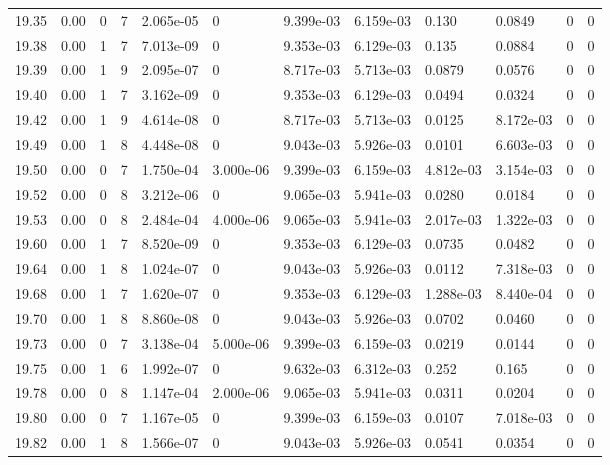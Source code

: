 \documentclass[preview]{standalone}
\begin{document}
{{{{{{{\begin{tabular}{L{1.2cm}C{1.2cm} C{0.3cm}C{0.5cm} C{1.4cm}C{1.4cm} C{1.4cm}C{1.4cm} C{1.6cm}C{1.6cm} C{1.6cm}C{1.6cm}}
  19.35  &  0.00  & 0     &  7 &  2.065e-05  & 0  &  9.399e-03&   6.159e-03& 0.130 & 0.0849   &  0 & 0  \\ 
  19.38  &  0.00  & 1     &  7 &  7.013e-09  & 0  &  9.353e-03&   6.129e-03& 0.135 & 0.0884   &  0 & 0  \\ 
  19.39  &  0.00  & 1     &  9 &  2.095e-07  & 0  &  8.717e-03&   5.713e-03& 0.0879 & 0.0576   &  0 & 0  \\ 
  19.40  &  0.00  & 1     &  7 &  3.162e-09  & 0  &  9.353e-03&   6.129e-03& 0.0494 & 0.0324   &  0 & 0  \\ 
  19.42  &  0.00  & 1     &  9 &  4.614e-08  & 0  &  8.717e-03&   5.713e-03& 0.0125 & 8.172e-03   &  0 & 0  \\ 
  19.49  &  0.00  & 1     &  8 &  4.448e-08  & 0  &  9.043e-03&   5.926e-03& 0.0101 & 6.603e-03   &  0 & 0  \\ 
  19.50  &  0.00  & 0     &  7 &  1.750e-04  & 3.000e-06  &  9.399e-03&   6.159e-03& 4.812e-03 & 3.154e-03   &  0 & 0  \\ 
  19.52  &  0.00  & 0     &  8 &  3.212e-06  & 0  &  9.065e-03&   5.941e-03& 0.0280 & 0.0184   &  0 & 0  \\ 
  19.53  &  0.00  & 0     &  8 &  2.484e-04  & 4.000e-06  &  9.065e-03&   5.941e-03& 2.017e-03 & 1.322e-03   &  0 & 0  \\ 
  19.60  &  0.00  & 1     &  7 &  8.520e-09  & 0  &  9.353e-03&   6.129e-03& 0.0735 & 0.0482   &  0 & 0  \\ 
  19.64  &  0.00  & 1     &  8 &  1.024e-07  & 0  &  9.043e-03&   5.926e-03& 0.0112 & 7.318e-03   &  0 & 0  \\ 
  19.68  &  0.00  & 1     &  7 &  1.620e-07  & 0  &  9.353e-03&   6.129e-03& 1.288e-03 & 8.440e-04   &  0 & 0  \\ 
  19.70  &  0.00  & 1     &  8 &  8.860e-08  & 0  &  9.043e-03&   5.926e-03& 0.0702 & 0.0460   &  0 & 0  \\ 
  19.73  &  0.00  & 0     &  7 &  3.138e-04  & 5.000e-06  &  9.399e-03&   6.159e-03& 0.0219 & 0.0144   &  0 & 0  \\ 
  19.75  &  0.00  & 1     &  6 &  1.992e-07  & 0  &  9.632e-03&   6.312e-03& 0.252 & 0.165   &  0 & 0  \\ 
  19.78  &  0.00  & 0     &  8 &  1.147e-04  & 2.000e-06  &  9.065e-03&   5.941e-03& 0.0311 & 0.0204   &  0 & 0  \\ 
  19.80  &  0.00  & 0     &  7 &  1.167e-05  & 0  &  9.399e-03&   6.159e-03& 0.0107 & 7.018e-03   &  0 & 0  \\ 
  19.82  &  0.00  & 1     &  8 &  1.566e-07  & 0  &  9.043e-03&   5.926e-03& 0.0541 & 0.0354   &  0 & 0  \\ 

\end{tabular}}}}}}}}
\end{document}
